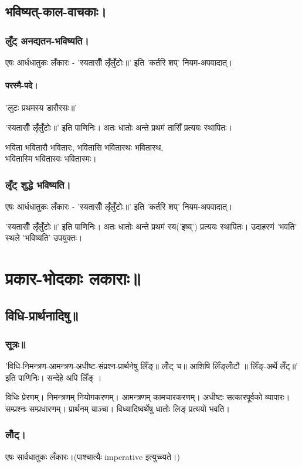 \documentclass[oneside, article]{memoir}
\begin{document}
\section{भविष्यत्-काल-वाचकाः।}
\subsection{लुँट् अनद्यतन-भविष्यति।}
एषः आर्धधातुकः लँकारः - 'स्यतासीँ लृँलुँटोः॥' इति 'कर्तरि शप्' नियम-अपवादात्।

\subsubsection{परस्मै-पदे।}
'लुटः प्रथमस्य डारौरसः॥'

'स्यतासीँ लृँलुँटोः॥' इति पाणिनिः। अतः धातोः अन्ते प्रथमं तासिँ प्रत्ययः स्थापितः। 

भविता भवितारौ भवितारः, भवितासि भवितास्थः भवितास्थ, \\
भवितास्मि भवितास्वः भवितास्मः।

\subsection{लृँट् शुद्धे भविष्यति।}
एषः आर्धधातुकः लँकारः - 'स्यतासीँ लृँलुँटोः॥' इति 'कर्तरि शप्' नियम-अपवादात्।

'स्यतासीँ लृँलुँटोः॥' इति पाणिनिः। अतः धातोः अन्ते प्रथमं स्य('इष्य्') प्रत्ययः स्थापितः। उदाहरणं 'भवति' स्थले 'भविष्यति' उपयुक्तः।

\chapter{प्रकार-भोदकाः लकाराः॥}
\section{विधि-प्रार्थनादिषु॥}
\subsection{सूत्रः॥}
'विधि-निमन्त्रण-आमन्त्रण-अधीष्ट-संप्रश्न-प्रार्थनेषु लिँङ्॥ लोँट् च॥ आशिषि लिँङ्लोँटौ ॥ लिँङ्-अर्थे लेँट्॥'  इति पाणिनिः। सन्देहे अपि लिँङ् ।

विधिः प्रेरणम्। निमन्त्रणम् नियोगकरणम्। आमन्त्रणम् कामचारकरणम्। अधीष्टः सत्कारपूर्वको व्यापारः। सम्प्रश्नः सम्प्रधारणम्। प्रार्थनम् याञ्चा। विध्यादिष्वर्थेषु धातोः लिङ् प्रत्ययो भवति।


\subsection{लोँट्।}
एषः सार्वधातुकः लँकारः।(पाश्चात्यैः imperative इत्युच्च्यते।)
\end{document}
